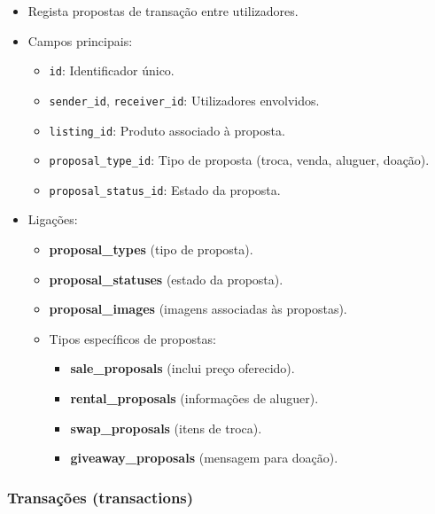\documentclass[a4paper, 12pt]{article} %
\begin{document}
\begin{itemize}
	\item Regista propostas de transação entre utilizadores.
	\item Campos principais:
	\begin{itemize}
		\item \verb|id|: Identificador único.
		\item \verb|sender_id|, \verb|receiver_id|: Utilizadores envolvidos.
		\item \verb|listing_id|: Produto associado à proposta.
		\item \verb|proposal_type_id|: Tipo de proposta (troca, venda, aluguer, doação).
		\item \verb|proposal_status_id|: Estado da proposta.
	\end{itemize}
	\item Ligações:
	\begin{itemize}
		\item \textbf{proposal\_types} (tipo de proposta).
		\item \textbf{proposal\_statuses} (estado da proposta).
		\item \textbf{proposal\_images} (imagens associadas às propostas).
		\item Tipos específicos de propostas:
		\begin{itemize}
			\item \textbf{sale\_proposals} (inclui preço oferecido).
			\item \textbf{rental\_proposals} (informações de aluguer).
			\item \textbf{swap\_proposals} (itens de troca).
			\item \textbf{giveaway\_proposals} (mensagem para doação).
		\end{itemize}
	\end{itemize}
\end{itemize}

\subsubsection{\textbf{Transações (transactions)}}
\end{document}
